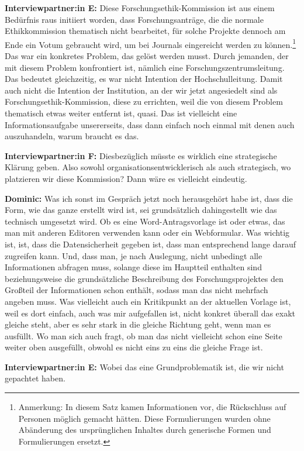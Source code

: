 \documentclass[a4paper,12pt,twoside]{scrreprt}
\begin{document}
\textbf{Interviewpartner:in E:} Diese Forschungsethik-Kommission ist aus einem Bedürfnis raus initiiert worden, dass Forschungsanträge, die die normale Ethikkommission thematisch nicht bearbeitet, für solche Projekte dennoch am Ende ein Votum gebraucht wird, um bei Journals eingereicht werden zu können.\footnote{Anmerkung: In diesem Satz kamen Informationen vor, die Rückschluss auf Personen möglich gemacht hätten. Diese Formulierungen wurden ohne Abänderung des ursprünglichen Inhaltes durch generische Formen und Formulierungen ersetzt.} Das war ein konkretes Problem, das gelöst werden musst. Durch jemanden, der mit diesem Problem konfrontiert ist, nämlich eine Forschungszentrumsleitung. Das bedeutet gleichzeitig, es war nicht Intention der Hochschulleitung. Damit auch nicht die Intention der Institution, an der wir jetzt angesiedelt sind als Forschungsethik-Kommission, diese zu errichten, weil die von diesem Problem thematisch etwas weiter entfernt ist, quasi. Das ist vielleicht eine Informationsaufgabe unsererseits, dass dann einfach noch einmal mit denen auch auszuhandeln, warum braucht es das.

\textbf{Interviewpartner:in F:} Diesbezüglich müsste es wirklich eine strategische Klärung geben. Also sowohl organisationsentwicklerisch als auch strategisch, wo platzieren wir diese Kommission? Dann wäre es vielleicht eindeutig.

\textbf{Dominic:} Was ich sonst im Gespräch jetzt noch herausgehört habe ist, dass die Form, wie das ganze erstellt wird ist, sei grundsätzlich dahingestellt wie das technisch umgesetzt wird. Ob es eine Word-Antragsvorlage ist oder etwas, das man mit anderen Editoren verwenden kann oder ein Webformular. Was wichtig ist, ist, dass die Datensicherheit gegeben ist, dass man entsprechend lange darauf zugreifen kann. Und, dass man, je nach Auslegung, nicht unbedingt alle Informationen abfragen muss, solange diese im Hauptteil enthalten sind beziehungsweise die grundsätzliche Beschreibung des Forschungsprojektes den Großteil der Informationen schon enthält, sodass man das nicht mehrfach angeben muss. Was vielleicht auch ein Kritikpunkt an der aktuellen Vorlage ist, weil es dort einfach, auch was mir aufgefallen ist, nicht konkret überall das exakt gleiche steht, aber es sehr stark in die gleiche Richtung geht, wenn man es ausfüllt. Wo man sich auch fragt, ob man das nicht vielleicht schon eine Seite weiter oben ausgefüllt, obwohl es nicht eins zu eins die gleiche Frage ist.

\textbf{Interviewpartner:in E:} Wobei das eine Grundproblematik ist, die wir nicht gepachtet haben.
\end{document}
